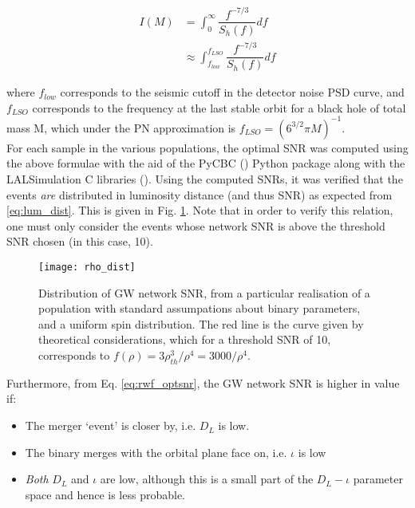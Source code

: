         \begin{align}
            I(M) &= \int_0^\infty \dfrac{f^{-7/3}}{S_h(f)} df \\
                 &\approx \int_{f_{low}}^{f_{LSO}} \dfrac{f^{-7/3}}{S_h(f)} df
            \label{eq:freq_integral}
        \end{align}

        where $f_{low}$ corresponds to the seismic cutoff in the detector noise PSD
        curve, and $f_{LSO}$ corresponds to the frequency at the last stable orbit for a
        black hole of total mass M, which under the PN approximation is $f_{LSO} =
        (6^{3/2} \pi M)^{-1}$.\\
        For each sample in the various populations, the optimal SNR was computed using
        the above formulae with the aid of the PyCBC (\cite{pycbc}) Python package along
        with the LALSimulation C libraries (\cite{lalsuite}). Using the computed SNRs,
        it was verified that the events \textit{are} distributed in luminosity distance
        (and thus SNR) as expected from \ref{eq:lum_dist}. This is given in
        Fig. \ref{fig:rho_dist}. Note that in order to verify this relation, one must
        only consider the events whose network SNR is above the threshold SNR chosen (in
        this case, 10).\\

        \begin{figure}[H]
            \centering
            \texttt{[image: rho\_dist]}
            \caption[Distribution of GW network SNR]
            {
                Distribution of GW network SNR, from a particular realisation of a
                population with standard assumpations about binary parameters, and a
                uniform spin distribution. The red line is the curve given by
                theoretical considerations, which for a threshold SNR of 10, corresponds
                to $f(\rho) = 3\rho_{th}^3 / \rho^4 = 3000 / \rho^4$.
            }
            \label{fig:rho_dist}
        \end{figure}


        Furthermore, from Eq. \ref{eq:rwf_optsnr}, the GW network SNR is higher in value
        if:

        \begin{itemize}

            \item The merger `event' is closer by, i.e. $D_L$ is low.

            \item The binary merges with the orbital plane face on, i.e. $\iota$ is low

            \item \emph{Both} $D_L$ and $\iota$ are low, although this is a small part
                of the $D_L-\iota$ parameter space and hence is less probable.

        \end{itemize}


